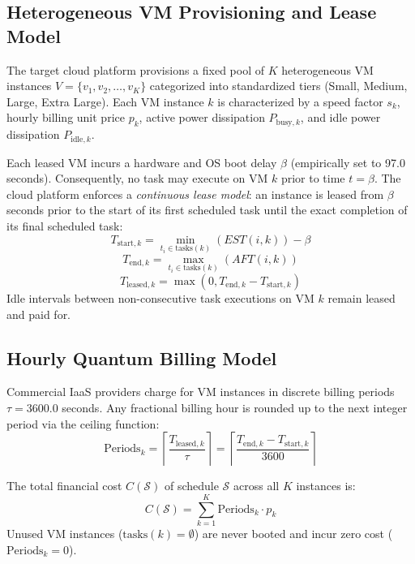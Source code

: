 \documentclass[journal]{IEEEtran}
\begin{document}
\subsection{Heterogeneous VM Provisioning and Lease Model}
The target cloud platform provisions a fixed pool of $K$ heterogeneous VM instances $V = \{v_1, v_2, \dots, v_K\}$ categorized into standardized tiers (Small, Medium, Large, Extra Large). Each VM instance $k$ is characterized by a speed factor $s_k$, hourly billing unit price $p_k$, active power dissipation $P_{\text{busy},k}$, and idle power dissipation $P_{\text{idle},k}$.

Each leased VM incurs a hardware and OS boot delay $\beta$ (empirically set to 97.0 seconds). Consequently, no task may execute on VM $k$ prior to time $t = \beta$. The cloud platform enforces a \textit{continuous lease model}: an instance is leased from $\beta$ seconds prior to the start of its first scheduled task until the exact completion of its final scheduled task:
\begin{equation}
T_{\text{start},k} = \min_{t_i \in \text{tasks}(k)} \left( EST(i, k) \right) - \beta
\label{eq:tstart}
\end{equation}
\begin{equation}
T_{\text{end},k} = \max_{t_i \in \text{tasks}(k)} \left( AFT(i, k) \right)
\label{eq:tend}
\end{equation}
\begin{equation}
T_{\text{leased},k} = \max\left(0, T_{\text{end},k} - T_{\text{start},k}\right)
\label{eq:tleased}
\end{equation}
Idle intervals between non-consecutive task executions on VM $k$ remain leased and paid for.

\subsection{Hourly Quantum Billing Model}
Commercial IaaS providers charge for VM instances in discrete billing periods $\tau = 3600.0$ seconds. Any fractional billing hour is rounded up to the next integer period via the ceiling function:
\begin{equation}
\text{Periods}_k = \left\lceil \frac{T_{\text{leased},k}}{\tau} \right\rceil = \left\lceil \frac{T_{\text{end},k} - T_{\text{start},k}}{3600} \right\rceil
\label{eq:periods}
\end{equation}

The total financial cost $C(\mathcal{S})$ of schedule $\mathcal{S}$ across all $K$ instances is:
\begin{equation}
C(\mathcal{S}) = \sum_{k=1}^{K} \text{Periods}_k \cdot p_k
\label{eq:cost}
\end{equation}
Unused VM instances ($\text{tasks}(k) = \emptyset$) are never booted and incur zero cost ($\text{Periods}_k = 0$).
\end{document}
